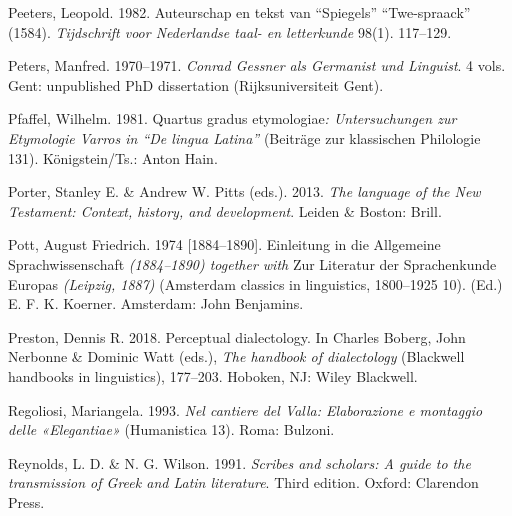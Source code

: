\begin{styleStandard}
Peeters, Leopold. 1982. Auteurschap en tekst van “Spiegels” “Twe-spraack” (1584). \textit{Tijdschrift voor Nederlandse taal- en letterkunde} 98(1). 117–129.
\end{styleStandard}

\begin{styleStandard}
Peters, Manfred. 1970–1971. \textit{Conrad Gessner als Germanist und Linguist}. 4 vols. Gent: unpublished PhD dissertation (Rijksuniversiteit Gent).
\end{styleStandard}

\begin{styleStandard}
Pfaffel, Wilhelm. 1981. Quartus gradus etymologiae\textit{: Untersuchungen zur Etymologie Varros in “De lingua Latina”} (Beiträge zur klassischen Philologie 131). Königstein/Ts.: Anton Hain.
\end{styleStandard}

\begin{styleStandard}
Porter, Stanley E. \& Andrew W. Pitts (eds.). 2013. \textit{The language of the New Testament: Context, history, and development}. Leiden \& Boston: Brill.
\end{styleStandard}

\begin{styleStandard}
Pott, August Friedrich. 1974 [1884–1890]. Einleitung in die Allgemeine Sprachwissenschaft\textit{ (1884–1890) together with }Zur Literatur der Sprachenkunde Europas\textit{ (Leipzig, 1887)} (Amsterdam classics in linguistics, 1800–1925 10). (Ed.) E. F. K. Koerner. Amsterdam: John Benjamins.
\end{styleStandard}

\begin{styleStandard}
Preston, Dennis R. 2018. Perceptual dialectology. In Charles Boberg, John Nerbonne \& Dominic Watt (eds.), \textit{The handbook of dialectology} (Blackwell handbooks in linguistics), 177–203. Hoboken, NJ: Wiley Blackwell.
\end{styleStandard}

\begin{styleStandard}
Regoliosi, Mariangela. 1993. \textit{Nel cantiere del Valla: Elaborazione e montaggio delle «Elegantiae»} (Humanistica 13). Roma: Bulzoni.
\end{styleStandard}

\begin{styleStandard}
Reynolds, L. D. \& N. G. Wilson. 1991. \textit{Scribes and scholars: A guide to the transmission of Greek and Latin literature}. Third edition. Oxford: Clarendon Press.
\end{styleStandard}

